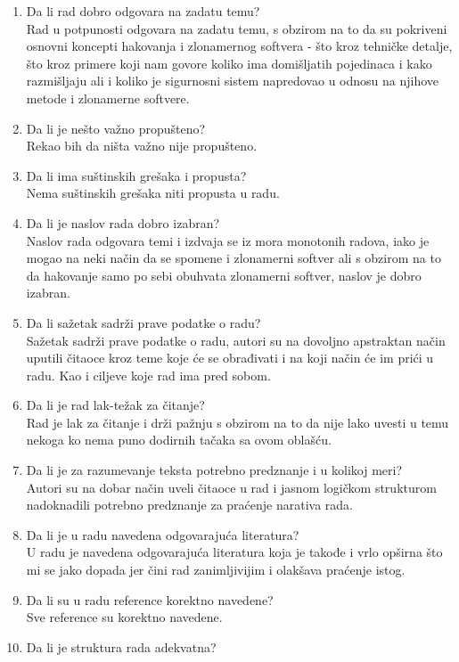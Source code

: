 \documentclass[a4paper]{report}
\begin{document}
\begin{enumerate}
\item Da li rad dobro odgovara na zadatu temu?\\
Rad u potpunosti odgovara na zadatu temu, s obzirom na to da su pokriveni osnovni koncepti hakovanja i zlonamernog softvera - što kroz tehničke detalje, što kroz primere koji nam govore koliko ima domišljatih pojedinaca i kako razmišljaju ali i koliko je sigurnosni sistem napredovao u odnosu na njihove metode i zlonamerne softvere.
\item Da li je nešto važno propušteno?\\
Rekao bih da ništa važno nije propušteno.
\item Da li ima suštinskih grešaka i propusta?\\
Nema suštinskih grešaka niti propusta u radu.
\item Da li je naslov rada dobro izabran?\\
Naslov rada odgovara temi i izdvaja se iz mora monotonih radova, iako je mogao na neki način da se spomene i zlonamerni softver ali s obzirom na to da hakovanje samo po sebi obuhvata zlonamerni softver, naslov je dobro izabran.
\item Da li sažetak sadrži prave podatke o radu?\\
Sažetak sadrži prave podatke o radu, autori su na dovoljno apstraktan način uputili čitaoce kroz teme koje će se obrađivati i na koji način će im prići u radu. Kao i ciljeve koje rad ima pred sobom.
\item Da li je rad lak-težak za čitanje?\\
Rad je lak za čitanje i drži pažnju s obzirom na to da nije lako uvesti u temu nekoga ko nema puno dodirnih tačaka sa ovom oblašću.
\item Da li je za razumevanje teksta potrebno predznanje i u kolikoj meri?\\
Autori su na dobar način uveli čitaoce u rad i jasnom logičkom strukturom nadoknadili potrebno predznanje za praćenje narativa rada.
\item Da li je u radu navedena odgovarajuća literatura?\\
U radu je navedena odgovarajuća literatura koja je takođe i vrlo opširna što mi se jako dopada jer čini rad zanimljivijim i olakšava praćenje istog.
\item Da li su u radu reference korektno navedene?\\
Sve reference su korektno navedene.
\item Da li je struktura rada adekvatna?\\

\end{enumerate}
\end{document}
